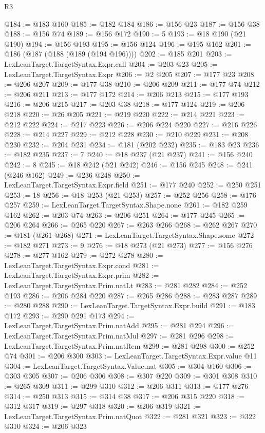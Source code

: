 \begin{lexlean}{R3}
\begin{coremodule}
@184 := @183 @160
@185 := @182 @184
@186 := @156 @23
@187 := @156 @38
@188 := @156 @74
@189 := @156 @172
@190 := 5
@193 := @18 @190 (@21 @190)
@194 := @156 @193
@195 := @156 @124
@196 := @195 @162
@201 := @186 (@187 (@188 (@189 (@194 @196))))
@202 := @185 @201
@203 := LexLeanTarget.TargetSyntax.Expr.call
@204 := @203 @23
@205 := LexLeanTarget.TargetSyntax.Expr
@206 := @2 @205
@207 := @177 @23
@208 := @206 @207
@209 := @177 @38
@210 := @206 @209
@211 := @177 @74
@212 := @206 @211
@213 := @177 @172
@214 := @206 @213
@215 := @177 @193
@216 := @206 @215
@217 := @203 @38
@218 := @177 @124
@219 := @206 @218
@220 := @26 @205
@221 := @219 @220
@222 := @214 @221
@223 := @212 @222
@224 := @217 @223
@226 := @206 @224 @220
@227 := @216 @226
@228 := @214 @227
@229 := @212 @228
@230 := @210 @229
@231 := @208 @230
@232 := @204 @231
@234 := @181 (@202 @232)
@235 := @183 @23
@236 := @182 @235
@237 := 7
@240 := @18 @237 (@21 @237)
@241 := @156 @240
@242 := 8
@245 := @18 @242 (@21 @242)
@246 := @156 @245
@248 := @241 (@246 @162)
@249 := @236 @248
@250 := LexLeanTarget.TargetSyntax.Expr.field
@251 := @177 @240
@252 := @250 @251
@253 := 18
@256 := @18 @253 (@21 @253)
@257 := @252 @256
@258 := @176 @257
@259 := LexLeanTarget.TargetSyntax.Shape.none
@261 := @182 @259 @162
@262 := @203 @74
@263 := @206 @251
@264 := @177 @245
@265 := @206 @264
@266 := @265 @220
@267 := @263 @266
@268 := @262 @267
@270 := @181 (@261 @268)
@271 := LexLeanTarget.TargetSyntax.Shape.some
@272 := @182 @271
@273 := 9
@276 := @18 @273 (@21 @273)
@277 := @156 @276
@278 := @277 @162
@279 := @272 @278
@280 := LexLeanTarget.TargetSyntax.Expr.cond
@281 := LexLeanTarget.TargetSyntax.Expr.prim
@282 := LexLeanTarget.TargetSyntax.Prim.natLt
@283 := @281 @282
@284 := @252 @193
@286 := @206 @284 @220
@287 := @265 @286
@288 := @283 @287
@289 := @280 @288
@290 := LexLeanTarget.TargetSyntax.Expr.build
@291 := @183 @172
@293 := @290 @291 @173
@294 := LexLeanTarget.TargetSyntax.Prim.natAdd
@295 := @281 @294
@296 := LexLeanTarget.TargetSyntax.Prim.natMul
@297 := @281 @296
@298 := LexLeanTarget.TargetSyntax.Prim.natRem
@299 := @281 @298
@300 := @252 @74
@301 := @206 @300
@303 := LexLeanTarget.TargetSyntax.Expr.value @11
@304 := LexLeanTarget.TargetSyntax.Value.nat
@305 := @304 @160
@306 := @303 @305
@307 := @206 @306
@308 := @307 @220
@309 := @301 @308
@310 := @265 @309
@311 := @299 @310
@312 := @206 @311
@313 := @177 @276
@314 := @250 @313
@315 := @314 @38
@317 := @206 @315 @220
@318 := @312 @317
@319 := @297 @318
@320 := @206 @319
@321 := LexLeanTarget.TargetSyntax.Prim.natQuot
@322 := @281 @321
@323 := @322 @310
@324 := @206 @323

\end{coremodule}
\end{lexlean}
